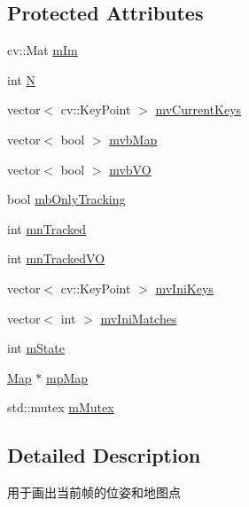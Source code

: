 \subsection*{Protected Attributes}
\begin{DoxyCompactItemize}
\item 
cv\+::\+Mat \mbox{\hyperlink{class_o_r_b___s_l_a_m2_1_1_frame_drawer_a2b405554be1a48ade50055af97c2c2c9}{m\+Im}}
\item 
int \mbox{\hyperlink{class_o_r_b___s_l_a_m2_1_1_frame_drawer_adbc9489192f5485ece966b0d6d589e47}{N}}
\item 
vector$<$ cv\+::\+Key\+Point $>$ \mbox{\hyperlink{class_o_r_b___s_l_a_m2_1_1_frame_drawer_a35ec8c5aea5cffee69ac5cec6abb5871}{mv\+Current\+Keys}}
\item 
vector$<$ bool $>$ \mbox{\hyperlink{class_o_r_b___s_l_a_m2_1_1_frame_drawer_aa7d745757f0a81f8460236036b837b0e}{mvb\+Map}}
\item 
vector$<$ bool $>$ \mbox{\hyperlink{class_o_r_b___s_l_a_m2_1_1_frame_drawer_ab47bccbb2ddfa65221a968736a6bd092}{mvb\+VO}}
\item 
bool \mbox{\hyperlink{class_o_r_b___s_l_a_m2_1_1_frame_drawer_ad7087ccda3d514be5e0132f889c3e949}{mb\+Only\+Tracking}}
\item 
int \mbox{\hyperlink{class_o_r_b___s_l_a_m2_1_1_frame_drawer_ae111426e790338d9f5f4556434716919}{mn\+Tracked}}
\item 
int \mbox{\hyperlink{class_o_r_b___s_l_a_m2_1_1_frame_drawer_ab1cbcb7a1443ceaaafaaf5537927f184}{mn\+Tracked\+VO}}
\item 
vector$<$ cv\+::\+Key\+Point $>$ \mbox{\hyperlink{class_o_r_b___s_l_a_m2_1_1_frame_drawer_a890a8bd44745b16024e1d7e82ac1d3f0}{mv\+Ini\+Keys}}
\item 
vector$<$ int $>$ \mbox{\hyperlink{class_o_r_b___s_l_a_m2_1_1_frame_drawer_a158a3ca6cab99c6bb691a7537212764b}{mv\+Ini\+Matches}}
\item 
int \mbox{\hyperlink{class_o_r_b___s_l_a_m2_1_1_frame_drawer_a00cc5f188d53b4d8f767f339515cc8e3}{m\+State}}
\item 
\mbox{\hyperlink{class_o_r_b___s_l_a_m2_1_1_map}{Map}} $\ast$ \mbox{\hyperlink{class_o_r_b___s_l_a_m2_1_1_frame_drawer_a48374a37e72786b2e64c15c0ec13ce7b}{mp\+Map}}
\item 
std\+::mutex \mbox{\hyperlink{class_o_r_b___s_l_a_m2_1_1_frame_drawer_a1425b923def88314bb43eddf3eee4ddb}{m\+Mutex}}
\end{DoxyCompactItemize}


\subsection{Detailed Description}
用于画出当前帧的位姿和地图点 

